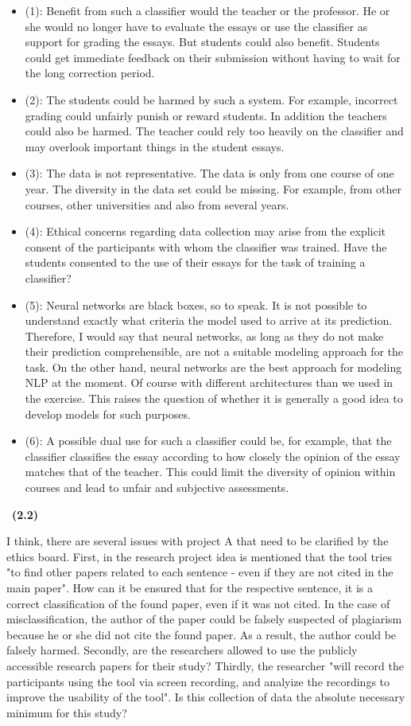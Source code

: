 \documentclass[a4 paper]{article}
\numberwithin{equation}{section}
\newcommand{\subproblem}[1]{~\newline\textbf{(#1)}}
\newcommand{\0}{\mathbf{0}}
\begin{document}
\begin{itemize}
 \item (1): Benefit from such a classifier would the teacher or the professor. He or she would no longer have to evaluate the essays or use the classifier as support for grading the essays. But students could also benefit. Students could get immediate feedback on their submission without having to wait for the long correction period.
 \item (2): The students could be harmed by such a system. For example, incorrect grading could unfairly punish or reward students. In addition the teachers could also be harmed. The teacher could rely too heavily on the classifier and may overlook important things in the student essays.
 \item (3): The data is not representative. The data is only from one course of one year. The diversity in the data set could be missing. For example, from other courses, other universities and also from several years.
 \item (4): Ethical concerns regarding data collection may arise from the explicit consent of the participants with whom the classifier was trained. Have the students consented to the use of their essays for the task of training a classifier?
 \item (5): Neural networks are black boxes, so to speak. It is not possible to understand exactly what criteria the model used to arrive at its prediction. Therefore, I would say that neural networks, as long as they do not make their prediction comprehensible, are not a suitable modeling approach for the task. On the other hand, neural networks are the best approach for modeling NLP at the moment. Of course with different architectures than we used in the exercise. This raises the question of whether it is generally a good idea to develop models for such purposes.
 \item (6): A possible dual use for such a classifier could be, for example, that the classifier classifies the essay according to how closely the opinion of the essay matches that of the teacher. This could limit the diversity of opinion within courses and lead to unfair and subjective assessments.
\end{itemize}

\subproblem{2.2}

I think, there are several issues with project A that need to be clarified by the ethics board. First, in the research project idea is mentioned that the tool tries "to find other papers related to each sentence - even if they are not cited in the main paper". How can it be ensured that for the respective sentence, it is a correct classification of the found paper, even if it was not cited. In the case of misclassification, the author of the paper could be falsely suspected of plagiarism because he or she did not cite the found paper. As a result, the author could be falsely harmed. Secondly, are the researchers allowed to use the publicly accessible research papers for their study? Thirdly, the researcher "will record the participants using the tool via screen recording, and analyize the recordings to improve the usability of the tool". Is this collection of data the absolute necessary minimum for this study?
\end{document}
